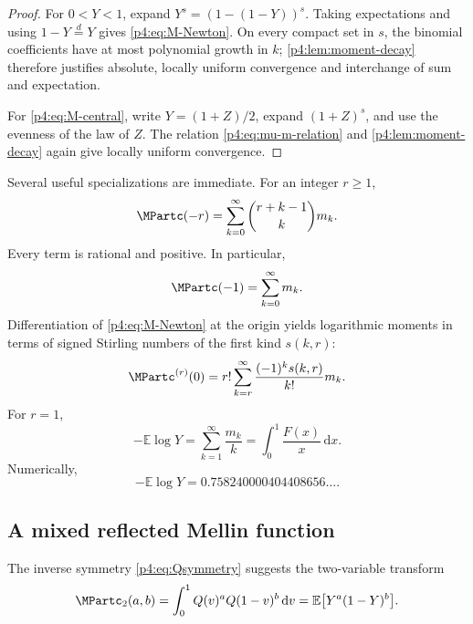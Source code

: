 \documentclass[11pt,oneside]{article}
\theoremstyle{definition}
\theoremstyle{remark}
\newcommand{\F}{F}
\newcommand{\Q}{Q}
\newcommand{\E}{\mathbb E}
\newcommand{\dd}{\,\mathrm d}
\newcommand{\1}{\mathbf 1}
\begin{document}
\begin{proof}
For \(0<Y<1\), expand
\(Y^s=(1-(1-Y))^s\).  Taking expectations and using
\(1-Y\overset d=Y\) gives \cref{p4:eq:M-Newton}.  On every compact set in \(s\), the
binomial coefficients have at most polynomial growth in \(k\); \cref{p4:lem:moment-decay}
therefore justifies absolute, locally uniform convergence and interchange of sum and
expectation.

For \cref{p4:eq:M-central}, write \(Y=(1+Z)/2\), expand \((1+Z)^s\), and use the
evenness of the law of \(Z\).  The relation \cref{p4:eq:mu-m-relation} and
\cref{p4:lem:moment-decay} again give locally uniform convergence.
\end{proof}

Several useful specializations are immediate.  For an integer \(r\ge1\),
\begin{equation}\label{p4:eq:negative-moment-rational-series}
 \MPartc(-r)=\sum_{k=0}^{\infty}\binom{r+k-1}{k}m_k.
\end{equation}
Every term is rational and positive.  In particular,
\begin{equation}\label{p4:eq:Mminus1-series}
 \MPartc(-1)=\sum_{k=0}^{\infty}m_k.
\end{equation}
Differentiation of \cref{p4:eq:M-Newton} at the origin yields logarithmic moments in
terms of signed Stirling numbers of the first kind \(s(k,r)\):
\begin{equation}\label{p4:eq:log-moment-Stirling}
 \MPartc^{(r)}(0)
 =r!\sum_{k=r}^{\infty}\frac{(-1)^ks(k,r)}{k!}m_k.
\end{equation}
For \(r=1\),
\begin{equation}\label{p4:eq:log-moment-constant}
 -\E\log Y
 =\sum_{k=1}^{\infty}\frac{m_k}{k}
 =\int_0^1\frac{\F(x)}x\dd x.
\end{equation}
Numerically,
\begin{equation}\label{p4:eq:log-moment-numeric}
 -\E\log Y=0.758240000404408656\ldots.
\end{equation}

\subsection{A mixed reflected Mellin function}

The inverse symmetry \cref{p4:eq:Qsymmetry} suggests the two-variable transform
\begin{equation}\label{p4:eq:M2def}
 \MPartc_2(a,b)=\int_0^1\Q(v)^a\Q(1-v)^b\dd v
 =\E\bigl[Y^a(1-Y)^b\bigr].
\end{equation}
\end{document}
